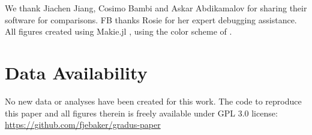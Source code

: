 \documentclass[fleqn,usenatbib]{mnras}
\begin{document}
We thank Jiachen Jiang, Cosimo Bambi and Askar Abdikamalov for sharing their software for comparisons. FB thanks Rosie for her expert debugging assistance. All figures created using Makie.jl \citep{DanischKrumbiegel2021}, using the color scheme of \cite{wong_points_2011}.

\section*{Data Availability}

No new data or analyses have been created for this work. The code to reproduce
this paper and all figures therein is freely available under GPL 3.0 license:
\url{https://github.com/fjebaker/gradus-paper}










\appendix



% 

% 
% 




\bsp	%
\label{lastpage}
\end{document}
